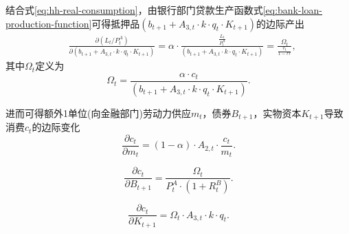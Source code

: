结合式\eqref{eq:hh-real-consumption}，由银行部门贷款生产函数式\eqref{eq:bank-loan-production-function}可得抵押品$(b_{t+1} + A_{3,t} \cdot k \cdot q_t \cdot K_{t+1})$的边际产出
\begin{equation}
\label{eq:bank-loan-pf-marginal-collateral}
\begin{split}
&\frac{\partial{\left(L_t/P_t^A\right)}}{\partial \left(b_{t+1} + A_{3,t} \cdot k \cdot q_t \cdot K_{t+1}\right)} = \alpha \cdot \frac{\frac{L_t}{P_t^A}}{\left(b_{t+1} + A_{3,t} \cdot k \cdot q_t \cdot K_{t+1}\right)} =\frac{\Omega_t}{\frac{v_t}{1-rr}},
\end{split}
\end{equation}
其中$\Omega_{t}$定义为
\begin{equation}
\label{eq:bank-def-omega}
\Omega_t = \frac{\alpha \cdot c_t}{\left(b_{t+1} + A_{3,t} \cdot k \cdot q_t \cdot K_{t+1}\right)}.
\end{equation}

进而可得额外1单位(向金融部门)劳动力供应$m_t$，债券$B_{t+1}$，实物资本$K_{t+1}$导致消费$c_t$的边际变化
\begin{equation}
\label{eq:bank-marg-prod-c-m}
\frac{\partial{c_t}}{\partial{m_t}} = \left(1-\alpha \right) \cdot A_{2,t} \cdot \frac{c_t}{m_t}.
\end{equation}

\begin{equation}
\label{eq:bank-marg-prod-c-b}
\frac{\partial{c_t}}{\partial{B_{t+1}}} = \frac{\Omega_t}{P_t^A \cdot \left(1+R_t^B \right)}.
\end{equation}

\begin{equation}
\label{eq:bank-marg-prod-c-k}
\frac{\partial{c_t}}{\partial{K_{t+1}}} = \Omega_t \cdot A_{3,t} \cdot k \cdot q_t.
\end{equation}

